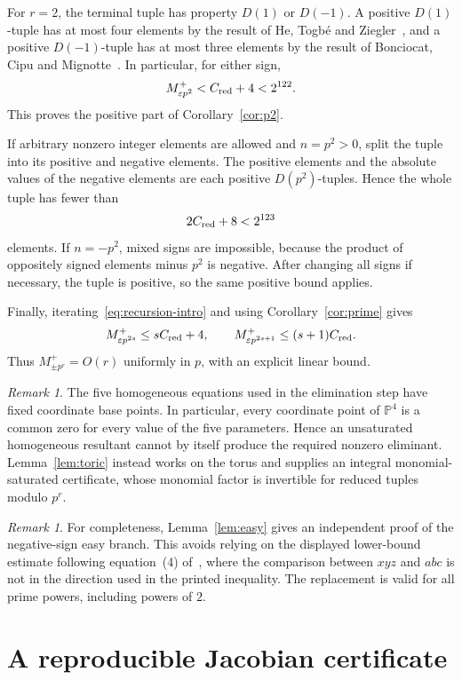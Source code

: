 \documentclass[11pt]{amsart}
\theoremstyle{remark}
\newtheorem{remark}[theorem]{Remark}
\newcommand{\eps}{\varepsilon}
\begin{document}
For $r=2$, the terminal tuple has property $D(1)$ or $D(-1)$. A positive
$D(1)$-tuple has at most four elements by the result of He, Togb\'e and Ziegler~\cite{HTZ},
and a positive $D(-1)$-tuple has at most three elements by the result of
Bonciocat, Cipu and Mignotte~\cite{BCM}. In particular, for either sign,
\[
 M_{\eps p^2}^+<C_{\rm red}+4<2^{122}.
\]
This proves the positive part of Corollary~\ref{cor:p2}.

If arbitrary nonzero integer elements are allowed and $n=p^2>0$, split the
tuple into its positive and negative elements. The positive elements and the
absolute values of the negative elements are each positive $D(p^2)$-tuples.
Hence the whole tuple has fewer than
\[
 2C_{\rm red}+8<2^{123}
\]
elements. If $n=-p^2$, mixed signs are impossible, because the product of
oppositely signed elements minus $p^2$ is negative. After changing all signs
if necessary, the tuple is positive, so the same positive bound applies.

Finally, iterating~\eqref{eq:recursion-intro} and using
Corollary~\ref{cor:prime} gives
\[
 M_{\eps p^{2s}}^+\le sC_{\rm red}+4,
 \qquad
 M_{\eps p^{2s+1}}^+\le (s+1)C_{\rm red}.
\]
Thus $M_{\pm p^r}^+=O(r)$ uniformly in $p$, with an explicit linear bound.

\begin{remark}%
The five homogeneous equations used in the elimination step have fixed
coordinate base points. In particular, every coordinate point of
$\mathbb P^4$ is a common zero for every value of the five parameters.
Hence an unsaturated homogeneous resultant cannot by itself produce the
required nonzero eliminant. Lemma~\ref{lem:toric} instead works on the torus
and supplies an integral monomial-saturated certificate, whose monomial
factor is invertible for reduced tuples modulo $p^r$.
\end{remark}

\begin{remark}%
For completeness, Lemma~\ref{lem:easy} gives an independent proof of the
negative-sign easy branch. This avoids relying on the displayed lower-bound
estimate following equation~(4) of~\cite{DL}, where the comparison between
$xyz$ and $abc$ is not in the direction used in the printed inequality.
The replacement is valid for all prime powers, including powers of $2$.
\end{remark}

\appendix
\section{A reproducible Jacobian certificate}\label{app:jacobian}
\end{document}
